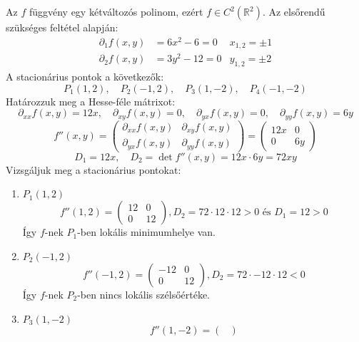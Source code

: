 \documentclass[a4paper,12pt]{article}
\begin{document}
\begin{solution}
	Az $f$ függvény egy kétváltozós polinom, ezért $f \in C^2{(\mathbb{R}^2)} $.  Az elsőrendű szükséges feltétel alapján:
	\begin{align*}
		\partial_{1}{f(x,y)} &= 6x^2 - 6  = 0 &x_{1,2}= \pm 1 \\
		\partial_{2}{f(x,y)} &= 3y^2 - 12 = 0 &y_{1,2}= \pm 2
	\end{align*}
	A stacionárius pontok a következők:
		\[
		P_1(1,2), \quad P_2(-1,2), \quad P_3(1,-2), \quad P_4(-1,-2) 
		\]
	Határozzuk meg a Hesse-féle mátrixot:
		\[
			\partial_{xx}{f(x,y)} = 12x, \quad \partial_{xy}{f(x,y)} = 0, \quad \partial_{yx}{f(x,y)} = 0, \quad \partial_{yy}{f(x,y)} = 6y
		\]
		\begin{equation*}
			f''(x,y) =
			\begin{pmatrix}
				\partial_{xx}{f(x,y)} & \partial_{xy}{f(x,y)} \\
				\partial_{yx}{f(x,y)} & \partial_{yy}{f(x,y)}
			\end{pmatrix} =
			\begin{pmatrix}
				12x & 0 \\
				0 & 6y
			\end{pmatrix}
		\end{equation*}
		\[
		D_1 = 12x, \quad D_2 = \det f''(x,y) = 12x \cdot 6y = 72xy
		\]
		Vizsgáljuk meg a stacionárius pontokat:
		\begin{enumerate}
			\item $P_1(1,2)$
			\begin{equation*}
				f''(1,2) =
				\begin{pmatrix}
					12 & 0 \\
					0 & 12
				\end{pmatrix}, D_2 = 72 \cdot 12 \cdot 12 > 0 \text{ és } D_1 = 12 > 0 
			\end{equation*}
			Így $f$-nek $P_1$-ben lokális minimumhelye van.
			\item $P_2(-1,2)$
			\begin{equation*}
				f''(-1,2) =
				\begin{pmatrix}
					-12 & 0 \\
					0 & 12
				\end{pmatrix}, D_2 = 72 \cdot -12 \cdot 12 < 0
			\end{equation*}
			Így $f$-nek $P_2$-ben nincs lokális szélsőértéke.
			\item $P_3(1,-2)$
			\begin{equation*}
				f''(1,-2) =
				\begin{pmatrix}

\end{pmatrix}
\end{equation*}
\end{enumerate}
\end{solution}
\end{document}
